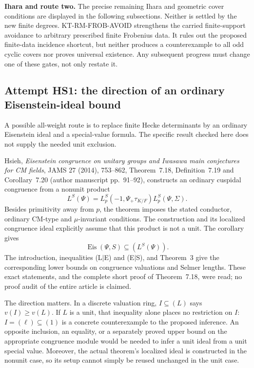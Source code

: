 \documentclass[11pt,a4paper]{article}
\theoremstyle{definition}
\renewcommand{\paragraph}[1]{\par\smallskip\noindent\textbf{#1}\quad\ignorespaces}
\begin{document}
\paragraph{Ihara and route two.}
The precise remaining Ihara and geometric cover conditions
are displayed in the following subsections. Neither is
settled by the new finite degrees. KT-RM-FROB-AVOID strengthens
the carried finite-support avoidance to arbitrary prescribed
finite Frobenius data. It rules out the proposed finite-data
incidence shortcut, but neither produces a counterexample to
all odd cyclic covers nor proves universal existence.
Any subsequent progress
must change one of these gates, not only restate it.



\subsection{Attempt HS1: the direction of an ordinary Eisenstein-ideal bound}

A possible all-weight route is to replace finite Hecke determinants
by an ordinary Eisenstein ideal and a special-value formula. The
specific result checked here does not supply the needed unit
exclusion.

Hsieh, \emph{Eisenstein congruence on unitary groups and Iwasawa
main conjectures for CM fields}, JAMS 27 (2014), 753--862,
Theorem~7.18, Definition~7.19 and Corollary~7.20
(author manuscript pp.~91--92), constructs an ordinary cuspidal
congruence from a nonunit product
\[
 L^S(\Psi)=L_p^S(-1,\Psi_+\tau_{K/F})L_p^S(\Psi,\Sigma).
\]
Besides primitivity away from $p$, the theorem imposes the
stated conductor, ordinary CM-type and $\mu$-invariant conditions.
The construction and its localized congruence ideal explicitly
assume that this product is not a unit. The corollary gives
\[
                \operatorname{Eis}(\Psi,S)\subseteq(L^S(\Psi)).
\]
The introduction, inequalities (L$\mid$E) and (E$\mid$S),
and Theorem~3 give the corresponding lower bounds on
congruence valuations and Selmer lengths. These exact
statements, and the complete short proof of Theorem~7.18,
were read; no proof audit of the entire article is claimed.

The direction matters. In a discrete valuation ring,
$I\subseteq(L)$ says $v(I)\geq v(L)$. If $L$ is a unit,
that inequality alone places no restriction on $I$:
$I=(\ell)\subseteq(1)$ is a concrete counterexample to
the proposed inference. An opposite inclusion, an equality,
or a separately proved upper bound on the appropriate
congruence module would be needed to infer a unit ideal
from a unit special value. Moreover, the actual theorem's
localized ideal is constructed in the nonunit case, so
its setup cannot simply be reused unchanged in the unit case.
\end{document}
